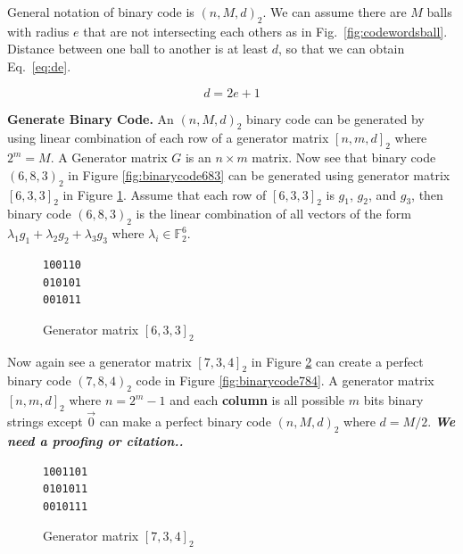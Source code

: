 \documentclass[conference,compsoc]{IEEEtran}
\begin{document}

General notation of binary code is $(n,M,d)_2$. We can assume there are $M$ balls with radius $e$ that are not intersecting each others as in Fig.~\ref{fig:codewordsball}. Distance between one ball to another is at least $d$, so that we can obtain Eq.~\ref{eq:de}.

\begin{equation} \label{eq:de}
d = 2e + 1
\end{equation}


\noindent \textbf{Generate Binary Code.}
An $(n,M,d)_2$ binary code can be generated by using linear combination of each row of a generator matrix $[n,m,d]_2$ where $2^m = M$. A Generator matrix $G$ is an $n \times m$ matrix. Now see that binary code $(6,8,3)_2$ in Figure \ref{fig:binarycode683} can be generated using generator matrix $[6,3,3]_2$ in Figure \ref{fig:generator633}. Assume that each row of $[6,3,3]_2$ is $g_1$, $g_2$, and $g_3$, then binary code $(6,8,3)_2$ is the linear combination of all vectors of the form ${\lambda}_1 g_1 + {\lambda}_2 g_2 + {\lambda}_3 g_3$ where $\lambda{_i} \in \mathbb{F}_2^6$.

\begin{figure}
\centering
\begin{BVerbatim}
100110
010101
001011
\end{BVerbatim}
\caption{Generator matrix $[6,3,3]_2$}
\label{fig:generator633}
\end{figure}

Now again see a generator matrix $[7,3,4]_2$ in Figure \ref{fig:generator734} can create a perfect binary code $(7,8,4)_2$ code in Figure \ref{fig:binarycode784}. A generator matrix $[n, m, d]_2$ where $n = 2^m - 1$ and each \textbf{column} is all possible $m$ bits binary strings except $\vec{0}$ can make a perfect binary code $(n,M,d)_2$ where $d = M/2$.
\textbf{\textit{We need a proofing or citation..}}

\begin{figure}
\centering
\begin{BVerbatim}
1001101
0101011
0010111
\end{BVerbatim}
\caption{Generator matrix $[7,3,4]_2$}
\label{fig:generator734}
\end{figure}
\end{document}
